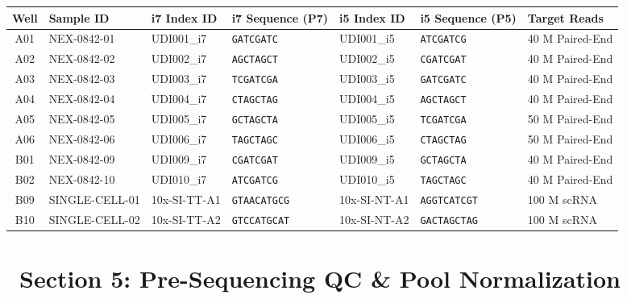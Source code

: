 \documentclass[10pt,a4paper]{article}
\begin{document}
\fontsize{7.5pt}{9.5pt}\selectfont
\begin{tabularx}{\linewidth}{@{} c l l X l X l @{}}
  \rowcolor{PrimaryBlue}
  \color{white}\textbf{Well} & \color{white}\textbf{Sample ID} & \color{white}\textbf{i7 Index ID} & \color{white}\textbf{i7 Sequence (P7)} & \color{white}\textbf{i5 Index ID} & \color{white}\textbf{i5 Sequence (P5)} & \color{white}\textbf{Target Reads} \\
  \hline
  A01 & NEX-0842-01 & UDI001\_i7 & \texttt{GATCGATC} & UDI001\_i5 & \texttt{ATCGATCG} & 40 M Paired-End \\
  A02 & NEX-0842-02 & UDI002\_i7 & \texttt{AGCTAGCT} & UDI002\_i5 & \texttt{CGATCGAT} & 40 M Paired-End \\
  A03 & NEX-0842-03 & UDI003\_i7 & \texttt{TCGATCGA} & UDI003\_i5 & \texttt{GATCGATC} & 40 M Paired-End \\
  A04 & NEX-0842-04 & UDI004\_i7 & \texttt{CTAGCTAG} & UDI004\_i5 & \texttt{AGCTAGCT} & 40 M Paired-End \\
  A05 & NEX-0842-05 & UDI005\_i7 & \texttt{GCTAGCTA} & UDI005\_i5 & \texttt{TCGATCGA} & 50 M Paired-End \\
  A06 & NEX-0842-06 & UDI006\_i7 & \texttt{TAGCTAGC} & UDI006\_i5 & \texttt{CTAGCTAG} & 50 M Paired-End \\
  B01 & NEX-0842-09 & UDI009\_i7 & \texttt{CGATCGAT} & UDI009\_i5 & \texttt{GCTAGCTA} & 40 M Paired-End \\
  B02 & NEX-0842-10 & UDI010\_i7 & \texttt{ATCGATCG} & UDI010\_i5 & \texttt{TAGCTAGC} & 40 M Paired-End \\
  B09 & SINGLE-CELL-01 & 10x-SI-TT-A1 & \texttt{GTAACATGCG} & 10x-SI-NT-A1 & \texttt{AGGTCATCGT} & 100 M scRNA \\
  B10 & SINGLE-CELL-02 & 10x-SI-TT-A2 & \texttt{GTCCATGCAT} & 10x-SI-NT-A2 & \texttt{GACTAGCTAG} & 100 M scRNA \\
  \bottomrule
\end{tabularx}

\newpage

\section{\faLayerGroup\ Section 5: Pre-Sequencing QC \& Pool Normalization}
\end{document}
